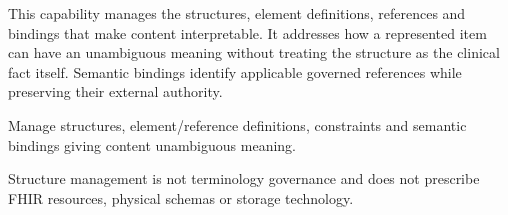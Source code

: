 This capability manages the structures, element definitions, references and bindings that make content interpretable. It addresses how a represented item can have an unambiguous meaning without treating the structure as the clinical fact itself. Semantic bindings identify applicable governed references while preserving their external authority.



Manage structures, element/\allowbreak{}reference definitions, constraints and semantic bindings giving content unambiguous meaning.



Structure management is not terminology governance and does not prescribe FHIR resources, physical schemas or storage technology.



